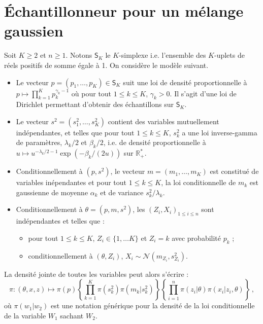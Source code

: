 \documentclass[a4paper,10pt,fleqn]{article}
\newcommand{\1}{\ensuremath{\mathbbm{1}}}
\begin{document}
\section*{\'Echantillonneur pour un m\'elange gaussien}
Soit $K\geq 2$ et $n\geq 1$. Notons $\mathsf{S}_K$ le $K$-simplexe i.e. l'ensemble des $K$-uplets de r\'eels positifs de somme \'egale \`a 1.  On consid\`ere le mod\`ele suivant.%
\begin{itemize}
\item Le vecteur $p = (p_1,\ldots,p_K)\in\mathsf{S}_K$ suit une loi de densit\'e proportionnelle \`a  $p \mapsto \prod_{k=1}^Kp_k^{\gamma_k-1}$ o\`u pour tout $1\leq k \leq K$, $\gamma_k>0$. Il s'agit d'une loi de Dirichlet permettant d'obtenir des \'echantillons sur $\mathsf{S}_K$.%
\item Le vecteur $s^2 =(s^2_{1},\ldots,s^2_K)$ contient des variables mutuellement ind\'ependantes, et telles que pour tout $1\leq k \leq K$, $s^2_k$ a une loi inverse-gamma de param\`etres, $\lambda_k/2$ et $\beta_k/2$, i.e. de densit\'e proportionnelle \`a $u\mapsto u^{-\lambda_k/2-1}\exp(-\beta_k/(2u))$ sur $\mathbb{R}_+^*$.
\item Conditionnellement \`a $(p,s^2)$, le vecteur $m=(m_1,\ldots,m_K)$ est constitu\'e de variables in\'ependantes et pour tout $1\leq k \leq K$, la loi conditionnelle de $m_k$ est gaussienne de moyenne $\alpha_k$ et de variance $s_k^2/\lambda_k$.
\item Conditionnellement \`a $\theta = (p, m, s^2)$, les $(Z_i,X_i)_{1\leq i \leq n}$ sont ind\'ependantes et telles que :
\begin{itemize}
\item pour tout $1\leq k \leq K$, $Z_i\in\{1,\ldots K\}$ et $Z_i = k $ avec probabilit\'e $p_k$ ;
\item conditionnellement \`a $(\theta,Z_i)$, $X_i \sim\mathcal{N}(m_{Z_i},s^2_{Z_i})$.
\end{itemize}
\end{itemize}
La densit\'e jointe de toutes les variables peut alors s'\'ecrire :
$$
\pi: (\theta,x,z) \mapsto \pi(p) \left\{\prod_{k=1}^K\pi(s_k^2)\pi(m_k|s_k^2)\right\}\left\{\prod_{i=1}^n\pi(z_i|\theta)\pi(x_i|z_i,\theta)\right\}\,,
$$
o\`u $\pi(w_1|w_2)$ est une notation g\'en\'erique pour la densit\'e de la loi conditionnelle de la variable $W_1$ sachant $W_2$.
\end{document}
